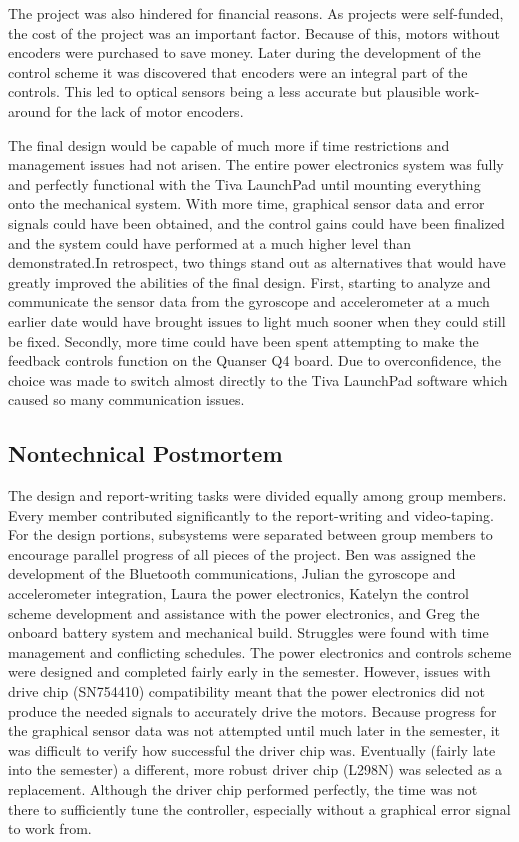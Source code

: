 \documentclass[11pt]{report}
\begin{document}
\begin{spacing}{1.5}
    The project was also hindered for financial reasons. As projects were self-funded, the cost of the project was an important factor. Because of this, motors without encoders were purchased to save money. Later during the development of the control scheme it was discovered that encoders were an integral part of the controls. This led to optical sensors being a less accurate but plausible work-around for the lack of motor encoders. 
    
    The final design would be capable of much more if time restrictions and management issues had not arisen. The entire power electronics system was fully and perfectly functional with the Tiva LaunchPad until mounting everything onto the mechanical system. With more time, graphical sensor data and error signals could have been obtained, and the control gains could have been finalized and the system could have performed at a much higher level than demonstrated.In retrospect, two things stand out as alternatives that would have greatly improved the abilities of the final design. First, starting to analyze and communicate the sensor data from the gyroscope and accelerometer at a much earlier date would have brought issues to light much sooner when they could still be fixed. Secondly, more time could have been spent attempting to make the feedback controls function on the Quanser Q4 board. Due to overconfidence, the choice was made to switch almost directly to the Tiva LaunchPad software which caused so many communication issues. 
    
    \subsection*{Nontechnical Postmortem}
    
    The design and report-writing tasks were divided equally among group members. Every member contributed significantly to the report-writing and video-taping. For the design portions, subsystems were separated between group members to encourage parallel progress of all pieces of the project. Ben was assigned the development of the Bluetooth communications, Julian the gyroscope and accelerometer integration, Laura the power electronics, Katelyn the control scheme development and assistance with the power electronics, and Greg the onboard battery system and mechanical build. Struggles were found with time management and conflicting schedules. The power electronics and controls scheme were designed and completed fairly early in the semester. However, issues with drive chip (SN754410) compatibility meant that the power electronics did not produce the needed signals to accurately drive the motors. Because progress for the graphical sensor data was not attempted until much later in the semester, it was difficult to verify how successful the driver chip was. Eventually (fairly late into the semester) a different, more robust driver chip (L298N) was selected as a replacement. Although the driver chip performed perfectly, the time was not there to sufficiently tune the controller, especially without a graphical error signal to work from. 
    

\end{spacing}
\end{document}
